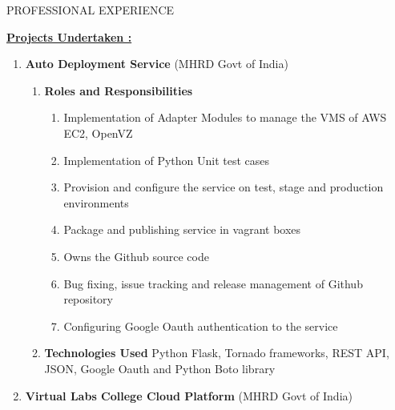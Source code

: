 \documentclass{resume} %
\begin{document}
\begin{rSection}{PROFESSIONAL EXPERIENCE}
\begin{rSubsection}






\uline {\textbf{Projects Undertaken :}}
\sectionlineskip

\begin{enumerate}[label=\bfseries\arabic*]

\item \textbf {Auto Deployment Service} (MHRD Govt of India)
  \begin{enumerate}
    
  \item \textbf{Roles and Responsibilities}
    \begin{enumerate}
    \item Implementation of Adapter Modules to manage the VMS of AWS
      EC2, OpenVZ
    \item Implementation of Python Unit test cases
    \item Provision and configure the service on test, stage and
      production environments
    \item Package and publishing service in vagrant boxes
    \item Owns the Github source code
    \item Bug fixing, issue tracking and release management of Github
      repository
    \item Configuring Google Oauth authentication to the service
    \end{enumerate}

    
  \item \textbf{Technologies Used } Python Flask, Tornado
    frameworks, REST API, JSON, Google Oauth and Python Boto
    library
  \end{enumerate}

\item \textbf {Virtual Labs College Cloud Platform} (MHRD Govt of India)
  \begin{enumerate}
    

\end{enumerate}
\end{enumerate}
\end{rSubsection}
\end{rSection}
\end{document}
